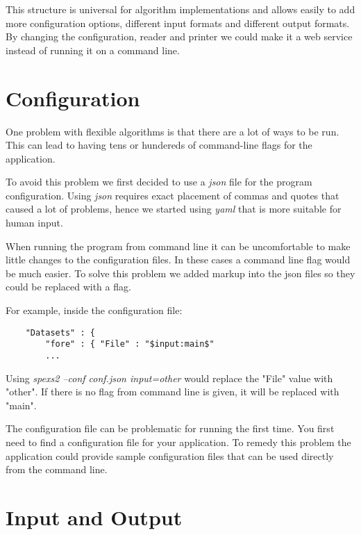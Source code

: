 This structure is universal for algorithm implementations and allows easily to add more configuration options, different input formats and different output formats. By changing the configuration, reader and printer we could make it a web service instead of running it on a command line.

\section{Configuration}

One problem with flexible algorithms is that there are a lot of ways to be run. This can lead to having tens or hundereds of command-line flags for the application.

To avoid this problem we first decided to use a \emph{json} file for the program configuration. Using \emph{json} requires exact placement of commas and quotes that caused a lot of problems, hence we started using \emph{yaml} that is more suitable for human input.


When running the program from command line it can be uncomfortable to make little changes to the configuration files. In these cases a command line flag would be much easier. To solve this problem we added markup into the json files so they could be replaced with a flag.

For example, inside the configuration file:

\begin{verbatim}
    "Datasets" : {
        "fore" : { "File" : "$input:main$"
        ...
\end{verbatim}

Using \emph{spexs2 --conf conf.json input=other} would replace the "File" value with "other". If there is no flag from command line is given, it will be replaced with "main".

The configuration file can be problematic for running the first time. You first need to find a configuration file for your application. To remedy this problem the application could provide sample configuration files that can be used directly from the command line.

\section{Input and Output}


